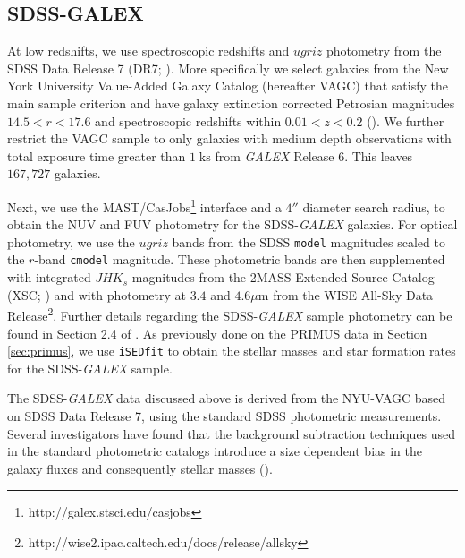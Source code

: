 \documentclass{emulateapj}
\begin{document}
\subsection{SDSS-GALEX} \label{sec:sdss}
At low redshifts, we use spectroscopic redshifts and $ugriz$ photometry from the SDSS Data Release 7 (DR7; \citealt{Abazajian:2009aa}). More specifically we select galaxies from the New York University Value-Added Galaxy Catalog (hereafter VAGC) that satisfy the main sample criterion and have galaxy extinction corrected Petrosian magnitudes $14.5 < r < 17.6$ and spectroscopic redshifts within $0.01 < z < 0.2$ (\citealt{Blanton:2005aa}). We further restrict the VAGC sample to only galaxies with medium depth observations with total exposure time greater than $1 \; \mathrm{ks}$ from {\em GALEX} Release 6. This leaves $167,727$ galaxies. 

Next, we use the MAST/CasJobs\footnote{http://galex.stsci.edu/casjobs} interface and a $4''$ diameter search radius, to obtain the NUV and FUV photometry for the SDSS-{\em GALEX} galaxies. For optical photometry, we use the $ugriz$ bands from the SDSS \texttt{model} magnitudes scaled to the $r$-band \texttt{cmodel} magnitude. These photometric bands are then supplemented with integrated $JHK_s$ magnitudes from the 2MASS Extended Source Catalog (XSC; \citealt{Jarrett:2000aa}) and with photometry at $3.4$ and $4.6 \mu \mathrm{m}$ from the WISE All-Sky Data Release\footnote{http://wise2.ipac.caltech.edu/docs/release/allsky}. Further details regarding the SDSS-{\em GALEX} sample photometry can be found in Section 2.4 of \cite{Moustakas:2013aa}. As previously done on the PRIMUS data in Section \ref{sec:primus}, we use \texttt{iSEDfit} to obtain the stellar masses and star formation rates for the SDSS-{\em GALEX} sample. 

The SDSS-{\em GALEX} data discussed above is derived from the NYU-VAGC
based on SDSS Data Release 7, using the standard SDSS photometric
measurements. Several investigators have found that the background
subtraction techniques used in the standard photometric catalogs
introduce a size dependent bias in the galaxy fluxes and consequently
stellar masses (\citealt{West:2005aa, Blanton:2005ab, Lauer:2007aa, Bernardi:2007aa,
  Hyde:2009aa, West:2010aa}).
\end{document}
